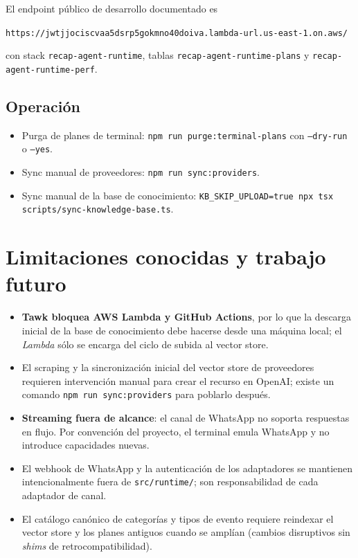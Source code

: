\documentclass[11pt,a4paper]{article}
\begin{document}
El endpoint público de desarrollo documentado es

\begin{center}
\texttt{https://jwtjjociscvaa5dsrp5gokmno40doiva.lambda-url.us-east-1.on.aws/}
\end{center}

con stack \texttt{recap-agent-runtime}, tablas
\texttt{recap-agent-runtime-plans} y
\texttt{recap-agent-runtime-perf}.

\subsection{Operación}

\begin{itemize}[leftmargin=*,itemsep=1pt]
  \item Purga de planes de terminal: \texttt{npm run purge:terminal-plans}
        con \texttt{--dry-run} o \texttt{--yes}.
  \item Sync manual de proveedores: \texttt{npm run sync:providers}.
  \item Sync manual de la base de conocimiento:
        \texttt{KB\_SKIP\_UPLOAD=true npx tsx scripts/sync-knowledge-base.ts}.
\end{itemize}

\section{Limitaciones conocidas y trabajo futuro}

\begin{itemize}[leftmargin=*,itemsep=2pt]
  \item \textbf{Tawk bloquea AWS Lambda y GitHub Actions}, por lo que
        la descarga inicial de la base de conocimiento debe hacerse
        desde una máquina local; el \emph{Lambda} sólo se encarga del
        ciclo de subida al vector store.
  \item El scraping y la sincronización inicial del vector store de
        proveedores requieren intervención manual para crear el
        recurso en OpenAI; existe un comando
        \texttt{npm run sync:providers} para poblarlo después.
  \item \textbf{Streaming fuera de alcance}: el canal de WhatsApp no
        soporta respuestas en flujo. Por convención del proyecto, el
        terminal emula WhatsApp y no introduce capacidades nuevas.
  \item El webhook de WhatsApp y la autenticación de los adaptadores
        se mantienen intencionalmente fuera de \texttt{src/runtime/};
        son responsabilidad de cada adaptador de canal.
  \item El catálogo canónico de categorías y tipos de evento requiere
      reindexar el vector store y los planes antiguos cuando se
      amplían (cambios disruptivos sin \emph{shims} de
      retrocompatibilidad).
\end{itemize}
\end{document}
